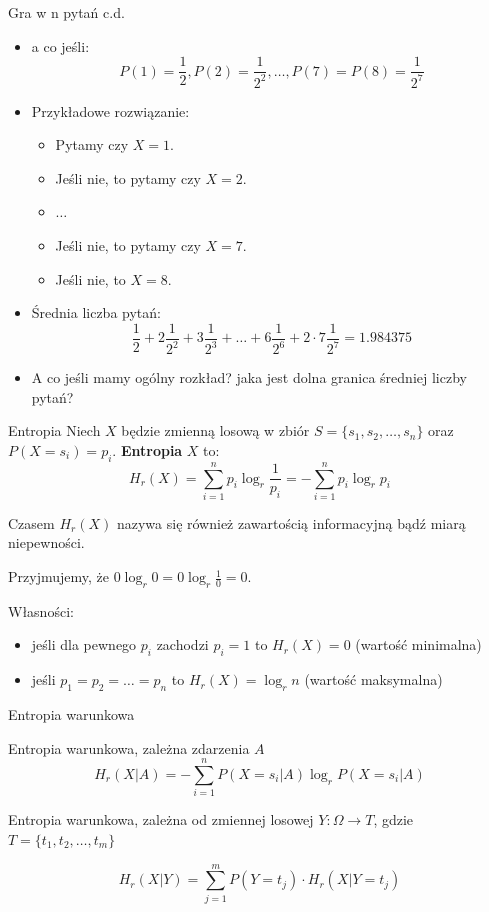 \documentclass{beamer}
\begin{document}
\begin{frame}{Gra w n pytań c.d.}

\begin{itemize}
  \item a co jeśli:
  $$
  P(1) = \frac{1}{2}, P(2) = \frac{1}{2^2}, \ldots, P(7) = P(8) = \frac{1}{2^7}
  $$
  \pause
  \item Przykładowe rozwiązanie:
  \begin{itemize}
    \item Pytamy czy $X=1$.
    \item Jeśli nie, to pytamy czy $X=2$.
    \item $\ldots$
    \item Jeśli nie, to pytamy czy $X=7$.
    \item Jeśli nie, to $X=8$.
  \end{itemize}
  \item Średnia liczba pytań:
  $$\frac{1}{2} + 2 \frac{1}{2^2} + 3 \frac{1}{2^3} + \ldots + 6 \frac{1}{2^6} +2 \cdot 7 \frac{1}{2^7} = 1.984375$$
  \item A co jeśli mamy ogólny rozkład? jaka jest dolna granica średniej liczby pytań?
\end{itemize}
\end{frame}


\begin{frame}{Entropia}
Niech $X$ będzie zmienną losową w zbiór $S = \{s_1, s_2, \ldots, s_n\}$
oraz $P(X=s_i) = p_i$. \textbf{Entropia} $X$ to:
$$
H_r(X) = \sum_{i=1}^{n} p_i \log_{r}{\frac{1}{p_i}} = - \sum_{i=1}^{n} p_i \log_{r}{p_i}
$$

Czasem $H_r(X)$ nazywa się również zawartością informacyjną bądź miarą niepewności.

Przyjmujemy, że $0 \log_r{0} = 0 \log_r{\frac{1}{0}} = 0$.

Własności:
\begin{itemize}
  \item jeśli dla pewnego $p_i$ zachodzi $p_i = 1$ to $H_r(X) = 0$ (wartość minimalna)
  \item jeśli $p_1 = p_2 = \ldots = p_n$ to $H_r(X) = \log_r{n}$ (wartość maksymalna)
\end{itemize}


\end{frame}


\begin{frame}{Entropia warunkowa}

Entropia warunkowa, zależna zdarzenia $A$
$$
H_r(X|A) = - \sum_{i=1}^{n} P(X=s_i | A) \log_{r}{P(X=s_i | A)}
$$

Entropia warunkowa, zależna od zmiennej losowej $Y: \Omega \to T$,
gdzie $T = \{t_1, t_2, \ldots, t_m\}$

$$
H_r(X|Y) = \sum_{j=1}^{m} P(Y=t_j) \cdot H_r(X|Y=t_j)
$$


\end{frame}
\end{document}
